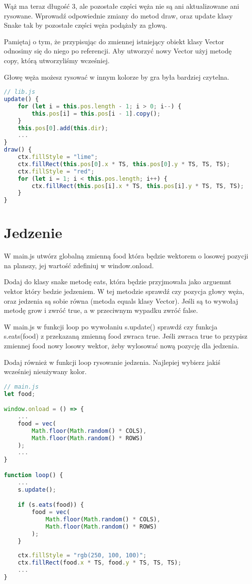 \documentclass[12pt]{article}
\begin{document}
Wąż ma teraz długość 3, ale pozostałe części węża nie są ani aktualizowane ani rysowane. Wprowadź odpowiednie zmiany do metod draw, oraz update klasy Snake tak by pozostałe części węża podążały za głową.

Pamiętaj o tym, że przypisując do zmiennej istniejący obiekt klasy Vector odnosimy się do niego po referencji. Aby utworzyć nowy Vector użyj metodę copy, którą utworzyliśmy wcześniej.

Głowę węża możesz rysować w innym kolorze by gra była bardziej czytelna.
\begin{lstlisting}[language=JavaScript]
// lib.js
update() {
    for (let i = this.pos.length - 1; i > 0; i--) {
        this.pos[i] = this.pos[i - 1].copy();
    }
    this.pos[0].add(this.dir);
    ...
}
draw() {
    ctx.fillStyle = "lime";
    ctx.fillRect(this.pos[0].x * TS, this.pos[0].y * TS, TS, TS);
    ctx.fillStyle = "red";
    for (let i = 1; i < this.pos.length; i++) {
        ctx.fillRect(this.pos[i].x * TS, this.pos[i].y * TS, TS, TS);
    }
}
\end{lstlisting}

\section{Jedzenie}

W main.js utwórz globalną zmienną food która będzie wektorem o losowej pozycji na planszy, jej wartość zdefiniuj w window.onload.

Dodaj do klasy snake metodę eats, która będzie przyjmowała jako arguemnt vektor który bedzie jedzeniem. W tej metodzie sprawdź czy pozycja głowy węża, oraz jedzenia są sobie równa (metoda equals klasy Vector). Jeśli są to wywołaj metodę grow i zwróć true, a w przeciwnym wypadku zwróć false.

W main.js w funkcji loop po wywołaniu s.update() sprawdź czy funkcja s.eats(food) z przekazaną zmienną food zwraca true. Jeśli zwraca true to przypisz zmiennej food nowy losowy wektor, żeby wylosować nową pozycję dla jedzenia.

Dodaj również w funkcji loop rysowanie jedzenia. Najlepiej wybierz jakiś wcześniej nieużywany kolor.

\begin{lstlisting}[language=JavaScript]
// main.js
let food;

window.onload = () => {
    ...
    food = vec(
        Math.floor(Math.random() * COLS),
        Math.floor(Math.random() * ROWS)
    );
    ...
}

function loop() {
    ...
    s.update();

    if (s.eats(food)) {
        food = vec(
            Math.floor(Math.random() * COLS),
            Math.floor(Math.random() * ROWS)
        );
    }
    
    ctx.fillStyle = "rgb(250, 100, 100)";
    ctx.fillRect(food.x * TS, food.y * TS, TS, TS);
    ...
}
\end{lstlisting}
\end{document}
